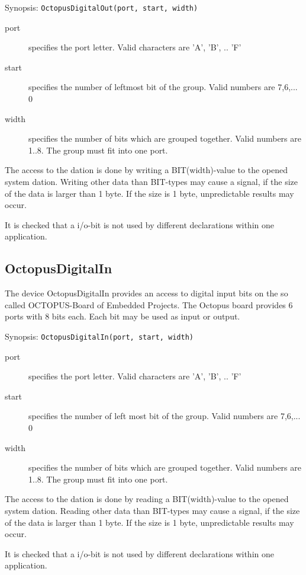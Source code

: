 Synopsis: \verb|OctopusDigitalOut(port, start, width)|

\begin{description}
\item [port] specifies the port letter. Valid characters are 'A', 'B', .. 'F'
\item[start] specifies the number of leftmost bit of the group. Valid numbers
     are 7,6,... 0
\item [width] specifies the number of bits which are grouped together.
     Valid numbers are 1..8.
     The group must fit into one port.
\end{description}

The access to the dation is done by writing a BIT(width)-value to the
opened system dation. 
Writing other data than BIT-types  may cause a signal, if the size of the
data is larger than 1 byte. If the size is 1 byte, unpredictable results may
occur.

It is checked that a i/o-bit is not used by different declarations within
one application.
  
\subsection{OctopusDigitalIn}
The device OctopusDigitalIn provides an access to digital input bits
on the so called OCTOPUS-Board of Embedded Projects.
The Octopus board provides 6 ports with 8 bits each. Each bit may be
used as input or output.

Synopsis: \verb|OctopusDigitalIn(port, start, width)|

\begin{description}
\item [port] specifies the port letter. Valid characters are 'A', 'B', .. 'F'
\item[start] specifies the number of left most bit of the group. Valid numbers
     are 7,6,... 0
\item [width] specifies the number of bits which are grouped together.
     Valid numbers are 1..8.
     The group must fit into one port.
\end{description}

The access to the dation is done by reading a BIT(width)-value to the
opened system dation. 
Reading other data than BIT-types  may cause a signal, if the size of the
data is larger than 1 byte. If the size is 1 byte, unpredictable results may
occur.

It is checked that a i/o-bit is not used by different declarations within
one application.
  
